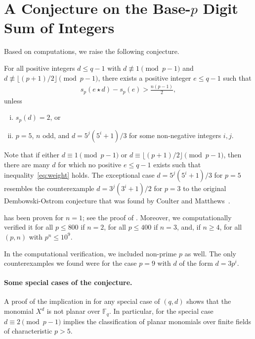 \documentclass[12pt]{article}
\newcommand{\F}{\mathbb{F}}
\newcommand{\wt}{s_p}
\begin{document}
\section{A Conjecture on the Base-\texorpdfstring{$p$}{p} Digit Sum of Integers}
Based on computations, we raise the following conjecture.


\begin{conjecture}
\label{conj:extended}
For all positive integers $d \le q - 1$ with $d \not\equiv 1 \pmod{p-1}$ and $d \not\equiv\lfloor (p + 1)/2 \rfloor \pmod{p-1}$, there exists a positive integer $e \le q - 1$ such that \begin{align}\label{eq:weight}\wt(e \star d) - \wt(e) > \frac{n(p-1)}{2},\end{align}
    unless
    \begin{enumerate}[(i)]
        \item $\wt(d) = 2$, or
        \item $p=5$, $n$ odd, and $d=5^j (5^i+1)/3$ for some non-negative integers $i,j$.
    \end{enumerate}
\end{conjecture}

Note that if either $d \equiv 1 \pmod{p-1}$ or $d \equiv \lfloor (p + 1)/2 \rfloor \pmod{p-1}$, then there are many $d$ for which no positive $e \leq q-1$ exists such that inequality~\eqref{eq:weight} holds. The exceptional case $d = 5^j (5^i + 1) / 3$ for $p = 5$ resembles the counterexample $d = 3^j (3^i + 1)/2$ for $p = 3$ to the original Dembowski-Ostrom conjecture that was found by Coulter and Matthews~\cite{DBLP:journals/dcc/CoulterM97}.

 has been proven for $n=1$; see the proof of . Moreover, we computationally verified it for all $p \leq 800$ if $n = 2$, for all $p \leq 400$ if $n = 3$, and, if $n \geq 4$, for all $(p,n)$ with $p^n \leq 10^9$. 
\begin{remark}
In the computational verification, we included non-prime $p$ as well. The only counterexamples we found were for the case $p=9$ with $d$ of the form $d = 3p^i$.
\end{remark}

\paragraph{Some special cases of the conjecture.}
A proof of the implication in  for any special case of $(q, d)$ shows that the monomial $X^d$ is not planar over $\F_{q}$. In particular,  for the special case $d \equiv 2 \pmod {p-1}$ implies the classification of planar monomials over finite fields of characteristic $p>5$.
\end{document}
